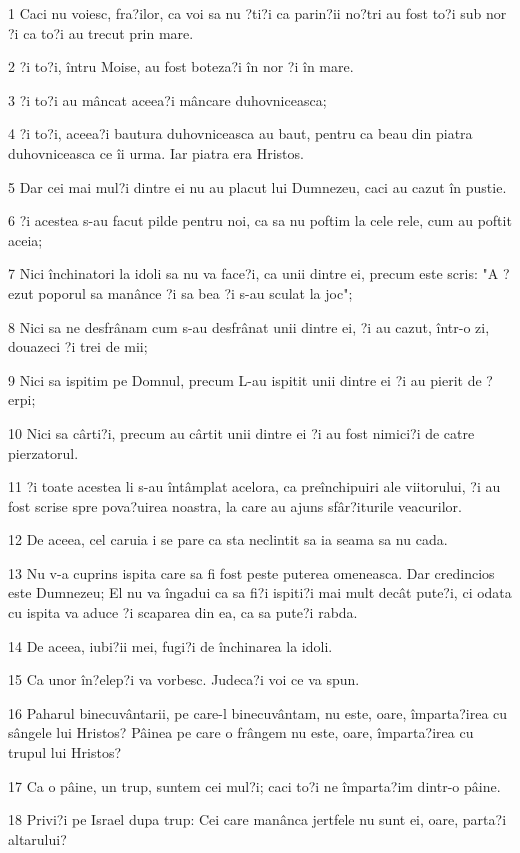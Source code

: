 \par 1 Caci nu voiesc, fra?ilor, ca voi sa nu ?ti?i ca parin?ii no?tri au fost to?i sub nor ?i ca to?i au trecut prin mare.
\par 2 ?i to?i, întru Moise, au fost boteza?i în nor ?i în mare.
\par 3 ?i to?i au mâncat aceea?i mâncare duhovniceasca;
\par 4 ?i to?i, aceea?i bautura duhovniceasca au baut, pentru ca beau din piatra duhovniceasca ce îi urma. Iar piatra era Hristos.
\par 5 Dar cei mai mul?i dintre ei nu au placut lui Dumnezeu, caci au cazut în pustie.
\par 6 ?i acestea s-au facut pilde pentru noi, ca sa nu poftim la cele rele, cum au poftit aceia;
\par 7 Nici închinatori la idoli sa nu va face?i, ca unii dintre ei, precum este scris: "A ?ezut poporul sa manânce ?i sa bea ?i s-au sculat la joc";
\par 8 Nici sa ne desfrânam cum s-au desfrânat unii dintre ei, ?i au cazut, într-o zi, douazeci ?i trei de mii;
\par 9 Nici sa ispitim pe Domnul, precum L-au ispitit unii dintre ei ?i au pierit de ?erpi;
\par 10 Nici sa cârti?i, precum au cârtit unii dintre ei ?i au fost nimici?i de catre pierzatorul.
\par 11 ?i toate acestea li s-au întâmplat acelora, ca preînchipuiri ale viitorului, ?i au fost scrise spre pova?uirea noastra, la care au ajuns sfâr?iturile veacurilor.
\par 12 De aceea, cel caruia i se pare ca sta neclintit sa ia seama sa nu cada.
\par 13 Nu v-a cuprins ispita care sa fi fost peste puterea omeneasca. Dar credincios este Dumnezeu; El nu va îngadui ca sa fi?i ispiti?i mai mult decât pute?i, ci odata cu ispita va aduce ?i scaparea din ea, ca sa pute?i rabda.
\par 14 De aceea, iubi?ii mei, fugi?i de închinarea la idoli.
\par 15 Ca unor în?elep?i va vorbesc. Judeca?i voi ce va spun.
\par 16 Paharul binecuvântarii, pe care-l binecuvântam, nu este, oare, împarta?irea cu sângele lui Hristos? Pâinea pe care o frângem nu este, oare, împarta?irea cu trupul lui Hristos?
\par 17 Ca o pâine, un trup, suntem cei mul?i; caci to?i ne împarta?im dintr-o pâine.
\par 18 Privi?i pe Israel dupa trup: Cei care manânca jertfele nu sunt ei, oare, parta?i altarului?
